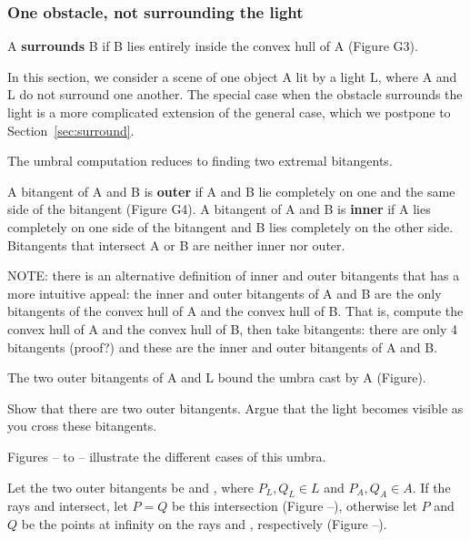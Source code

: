 \documentclass[12pt]{article}
\begin{document}
\subsubsection{One obstacle, not surrounding the light}
\label{sec:notsurround}

\begin{defn2}
\label{defn:surround}
A {\bf surrounds} B if B lies entirely inside the convex hull of A (Figure G3).
\end{defn2}

In this section, we consider a scene of one object A lit by a light L,
where A and L do not surround one another.
The special case when the obstacle surrounds the light
is a more complicated extension of the general case, which we postpone
to Section~\ref{sec:surround}.

The umbral computation reduces to finding two extremal bitangents.

\begin{defn2}
\label{defn:outer}
A bitangent of A and B is {\bf outer} if 
A and B lie completely on one and the same side of the bitangent (Figure G4).
A bitangent of A and B is {\bf inner} if A lies completely on one side of the
bitangent and B lies completely on the other side.
Bitangents that intersect A or B are neither inner nor outer.
\end{defn2}

NOTE: there is an alternative definition of inner and outer bitangents
that has a more intuitive appeal: the inner and outer bitangents of A and B
are the only bitangents of the convex hull of A and the convex hull of B.
That is, compute the convex hull of A and the convex hull of B, then take
bitangents: there are only 4 bitangents (proof?) and these are the inner and
outer bitangents of A and B.

\begin{lemma}
The two outer bitangents of A and L bound the umbra cast by A (Figure).
\end{lemma}
\prf
Show that there are two outer bitangents.
Argue that the light becomes visible as you cross these bitangents.
\QED

Figures -- to -- illustrate the different cases of this umbra.

Let the two outer bitangents be  and ,
where $P_L,Q_L \in L$ and $P_A,Q_A \in A$.
If the rays  and  intersect,
let $P=Q$ be this intersection (Figure --),
otherwise let $P$ and $Q$ be the points 
at infinity on the rays  and , respectively 
(Figure --).
\end{document}
